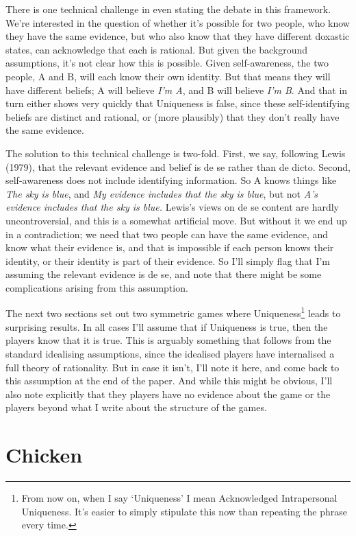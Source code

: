 \documentclass[
  11pt,
]{article}
\begin{document}
There is one technical challenge in even stating the debate in this framework. We're interested in the question of whether it's possible for two people, who know they have the same evidence, but who also know that they have different doxastic states, can acknowledge that each is rational. But given the background assumptions, it's not clear how this is possible. Given self-awareness, the two people, A and B, will each know their own identity. But that means they will have different beliefs; A will believe \emph{I'm A}, and B will believe \emph{I'm B}. And that in turn either shows very quickly that Uniqueness is false, since these self-identifying beliefs are distinct and rational, or (more plausibly) that they don't really have the same evidence.

The solution to this technical challenge is two-fold. First, we say, following Lewis (1979), that the relevant evidence and belief is de se rather than de dicto. Second, self-awareness does not include identifying information. So A knows things like \emph{The sky is blue}, and \emph{My evidence includes that the sky is blue}, but not \emph{A's evidence includes that the sky is blue.} Lewis's views on de se content are hardly uncontroversial, and this is a somewhat artificial move. But without it we end up in a contradiction; we need that two people can have the same evidence, and know what their evidence is, and that is impossible if each person knows their identity, or their identity is part of their evidence. So I'll simply flag that I'm assuming the relevant evidence is de se, and note that there might be some complications arising from this assumption.

The next two sections set out two symmetric games where Uniqueness\footnote{From now on, when I say `Uniqueness' I mean Acknowledged Intrapersonal Uniqueness. It's easier to simply stipulate this now than repeating the phrase every time.} leads to surprising results. In all cases I'll assume that if Uniqueness is true, then the players know that it is true. This is arguably something that follows from the standard idealising assumptions, since the idealised players have internalised a full theory of rationality. But in case it isn't, I'll note it here, and come back to this assumption at the end of the paper. And while this might be obvious, I'll also note explicitly that they players have no evidence about the game or the players beyond what I write about the structure of the games.

\hypertarget{chicken}{%
\section{Chicken}\label{chicken}}
\end{document}
